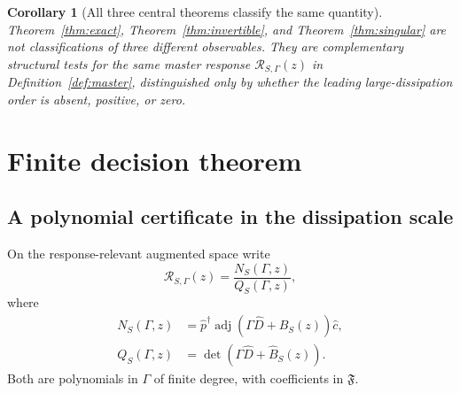 \documentclass[11pt]{article}
\newtheorem{corollary}[theorem]{Corollary}
\theoremstyle{definition}
\theoremstyle{remark}
\theoremstyle{plain}
\newcommand{\R}{\mathcal R}
\newcommand{\adj}{\operatorname{adj}}
\begin{document}
\begin{corollary}[All three central theorems classify the same quantity]
Theorem~\ref{thm:exact}, Theorem~\ref{thm:invertible}, and Theorem~\ref{thm:singular} are not classifications of three different observables.  They are complementary structural tests for the same master response $\R_{S,\Gamma}(z)$ in Definition~\ref{def:master}, distinguished only by whether the leading large-dissipation order is absent, positive, or zero.
\end{corollary}

\section{Finite decision theorem}

\subsection{A polynomial certificate in the dissipation scale}
On the response-relevant augmented space write
\begin{equation}
 \R_{S,\Gamma}(z)
 =\frac{N_S(\Gamma,z)}{Q_S(\Gamma,z)},
\end{equation}
where
\begin{align}
 N_S(\Gamma,z)
 &=\widehat p^\dagger\adj\!\left(\Gamma\widehat D+
 \widehat B_S(z)\right)\widehat c,\label{eq:numerator}\\
 Q_S(\Gamma,z)
 &=\det\!\left(\Gamma\widehat D+
 \widehat B_S(z)\right).\label{eq:denominator}
\end{align}
Both are polynomials in $\Gamma$ of finite degree, with coefficients in $\mathfrak F$.
\end{document}
